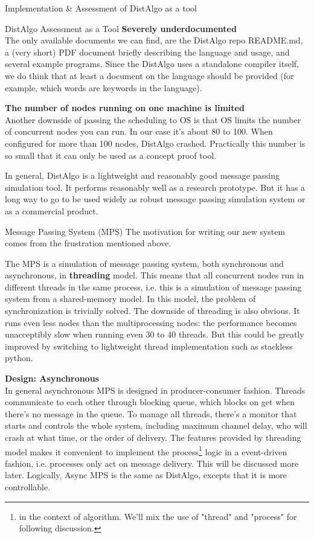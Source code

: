 \documentclass[12pt]{article}  %
\begin{document}
\begin{section}{Implementation \& Assessment of DistAlgo as a tool}
\begin{subsection}{DistAlgo Assessment as a Tool}
\noindent
\textbf{Severely underdocumented}\\
The only available documents we can find, are the DistAlgo repo README.md, a (very short) PDF document briefly
describing the language and usage, and several example programs. Since the DistAlgo uses a standalone compiler itself, 
we do think that at least a document on the language should be provided (for example, 
which words are keywords in the language).

\noindent
\textbf{The number of nodes running on one machine is limited}\\
Another downside of passing the scheduling to OS is that OS limits the number of concurrent nodes you can run.
In our case it's about 80 to 100. When configured for more than 100 nodes, DistAlgo crashed.
Practically this number is so small that it can only be used as a concept proof tool.

In general, DistAlgo is a lightweight and reasonably good message passing simulation tool. It performs reasonably well
as a research prototype. But it has a long way to go to be used widely as robust message passing simulation system
or as a commercial product.
\end{subsection}

\begin{subsection}{Message Passing System (MPS)}
The motivation for writing our new system comes from the frustration mentioned above.

The MPS is a simulation of message passing system, both synchronous and asynchronous, 
in \textbf{threading} model. This means that all concurrent nodes run in different threads in the same process, i.e.
this is a simulation of message passing system from a shared-memory model.
In this model, the problem of synchronization is trivially solved. The downside of threading is also obvious.
It runs even less nodes than the multiprocessing nodes: the performance becomes unacceptibly slow 
when running even 30 to 40 threads. But this could be greatly improved by switching to lightweight thread implementation
such as stackless python. 

\noindent
\textbf{Design: Asynchronous}\\
In general asynchronous MPS is designed in producer-consumer fashion. Threads communicate to each other through
blocking queue, which blocks on get when there's no message in the queue. To manage all threads, there's a
monitor that starts and controls the whole system, including maximum channel delay, who will crash at what time, 
or the order of delivery. The features provided by threading model makes it convenient to implement 
the process\footnote{in the context of algorithm. We'll mix the use of "thread" and "process" for following discussion.}
logic in a event-driven fashion,  i.e. processes only act on message delivery. This will be discussed more later.
Logically, Async MPS is the same as DistAlgo, excepts that it is more controllable.


\end{subsection}
\end{section}
\end{document}
